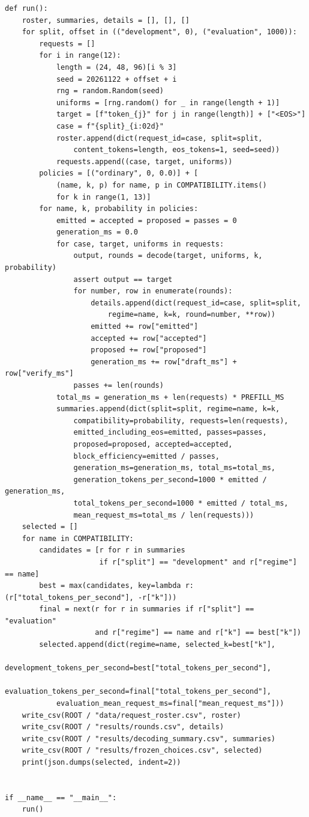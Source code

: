 \begin{Verbatim}[breaklines,breakanywhere,fontsize=\small]
def run():
    roster, summaries, details = [], [], []
    for split, offset in (("development", 0), ("evaluation", 1000)):
        requests = []
        for i in range(12):
            length = (24, 48, 96)[i % 3]
            seed = 20261122 + offset + i
            rng = random.Random(seed)
            uniforms = [rng.random() for _ in range(length + 1)]
            target = [f"token_{j}" for j in range(length)] + ["<EOS>"]
            case = f"{split}_{i:02d}"
            roster.append(dict(request_id=case, split=split,
                content_tokens=length, eos_tokens=1, seed=seed))
            requests.append((case, target, uniforms))
        policies = [("ordinary", 0, 0.0)] + [
            (name, k, p) for name, p in COMPATIBILITY.items()
            for k in range(1, 13)]
        for name, k, probability in policies:
            emitted = accepted = proposed = passes = 0
            generation_ms = 0.0
            for case, target, uniforms in requests:
                output, rounds = decode(target, uniforms, k, probability)
                assert output == target
                for number, row in enumerate(rounds):
                    details.append(dict(request_id=case, split=split,
                        regime=name, k=k, round=number, **row))
                    emitted += row["emitted"]
                    accepted += row["accepted"]
                    proposed += row["proposed"]
                    generation_ms += row["draft_ms"] + row["verify_ms"]
                passes += len(rounds)
            total_ms = generation_ms + len(requests) * PREFILL_MS
            summaries.append(dict(split=split, regime=name, k=k,
                compatibility=probability, requests=len(requests),
                emitted_including_eos=emitted, passes=passes,
                proposed=proposed, accepted=accepted,
                block_efficiency=emitted / passes,
                generation_ms=generation_ms, total_ms=total_ms,
                generation_tokens_per_second=1000 * emitted / generation_ms,
                total_tokens_per_second=1000 * emitted / total_ms,
                mean_request_ms=total_ms / len(requests)))
    selected = []
    for name in COMPATIBILITY:
        candidates = [r for r in summaries
                      if r["split"] == "development" and r["regime"] == name]
        best = max(candidates, key=lambda r: (r["total_tokens_per_second"], -r["k"]))
        final = next(r for r in summaries if r["split"] == "evaluation"
                     and r["regime"] == name and r["k"] == best["k"])
        selected.append(dict(regime=name, selected_k=best["k"],
            development_tokens_per_second=best["total_tokens_per_second"],
            evaluation_tokens_per_second=final["total_tokens_per_second"],
            evaluation_mean_request_ms=final["mean_request_ms"]))
    write_csv(ROOT / "data/request_roster.csv", roster)
    write_csv(ROOT / "results/rounds.csv", details)
    write_csv(ROOT / "results/decoding_summary.csv", summaries)
    write_csv(ROOT / "results/frozen_choices.csv", selected)
    print(json.dumps(selected, indent=2))


if __name__ == "__main__":
    run()
\end{Verbatim}

